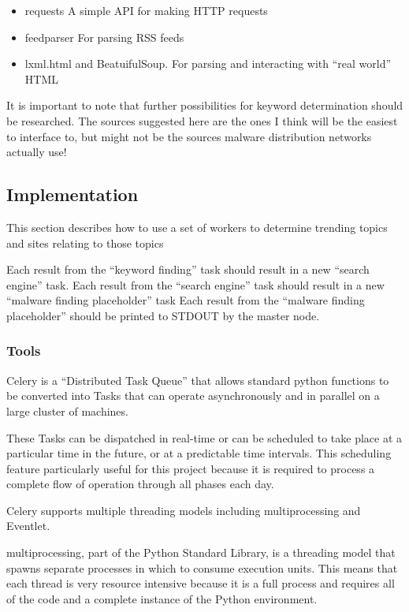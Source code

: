 \begin{itemize}
    \item requests A simple API for making HTTP requests
    \item feedparser For parsing RSS feeds
    \item lxml.html and BeatuifulSoup. For parsing and interacting with ``real world'' HTML
\end{itemize}

It is important to note that further possibilities for keyword determination should be researched. The sources suggested here are the ones I think will be the easiest to interface to, but might not be the sources malware distribution networks actually use!

\subsection{Implementation}
This section describes how to use a set of workers to determine trending topics and sites relating to those topics

Each result from the ``keyword finding'' task should result in a new ``search engine'' task.
Each result from the ``search engine'' task should result in a new ``malware finding placeholder'' task
Each result from the ``malware finding placeholder'' should be printed to STDOUT by the master node.
\subsubsection{Tools}
Celery is a ``Distributed Task Queue'' that allows standard python functions to be converted into Tasks that can operate asynchronously and in parallel on a large cluster of machines.

These Tasks can be dispatched in real-time or can be scheduled to take place at a particular time in the future, or at a predictable time intervals.  This scheduling feature particularly useful for this project because it is required to process a complete flow of operation through all phases each day.

Celery supports multiple threading models including 
multiprocessing and Eventlet.

multiprocessing, part of the Python Standard Library, is a threading model that spawns separate processes in which to consume execution units.  This means that each thread is very resource intensive because it is a full process and requires all of the code and a complete instance of the Python environment.

